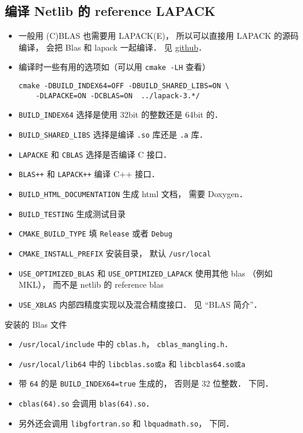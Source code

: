 \subsection{编译 Netlib 的 reference LAPACK}
\begin{itemize}
\item 一般用 (C)BLAS 也需要用 LAPACK(E)， 所以可以直接用 LAPACK 的源码编译， 会把 Blas 和 lapack 一起编译． 见 \href{https://github.com/Reference-LAPACK/lapack/}{github}．
\item 编译时一些有用的选项如（可以用 \verb|cmake -LH| 查看）
\begin{lstlisting}[language=none]
cmake -DBUILD_INDEX64=OFF -DBUILD_SHARED_LIBS=ON \
    -DLAPACKE=ON -DCBLAS=ON  ../lapack-3.*/
\end{lstlisting}
\item \verb|BUILD_INDEX64| 选择是使用 32bit 的整数还是 64bit 的．
\item \verb|BUILD_SHARED_LIBS| 选择是编译 \verb|.so| 库还是 \verb|.a| 库．
\item \verb|LAPACKE| 和 \verb|CBLAS| 选择是否编译 C 接口．
\item \verb|BLAS++| 和 \verb|LAPACK++| 编译 C++ 接口．
\item \verb|BUILD_HTML_DOCUMENTATION| 生成 html 文档， 需要 Doxygen．
\item \verb|BUILD_TESTING| 生成测试目录
\item \verb|CMAKE_BUILD_TYPE| 填 \verb|Release| 或者 \verb|Debug|
\item \verb|CMAKE_INSTALL_PREFIX| 安装目录， 默认 \verb|/usr/local|
\item \verb|USE_OPTIMIZED_BLAS| 和 \verb|USE_OPTIMIZED_LAPACK| 使用其他 blas （例如 MKL）， 而不是 netlib 的 reference blas
\item \verb|USE_XBLAS| 内部四精度实现以及混合精度接口． 见 “BLAS 简介\upref{BLAS}”．
\end{itemize}

安装的 Blas 文件
\begin{itemize}
\item \verb|/usr/local/include| 中的 \verb|cblas.h|， \verb|cblas_mangling.h|．
\item \verb|/usr/local/lib64| 中的 \verb|libcblas.so或a| 和 \verb|libcblas64.so或a|
\item 带 \verb|64| 的是 \verb|BUILD_INDEX64=true| 生成的， 否则是 32 位整数． 下同．
\item \verb|cblas(64).so| 会调用 \verb|blas(64).so|．
\item 另外还会调用 \verb|libgfortran.so| 和 \verb|lbquadmath.so|， 下同．
\end{itemize}

